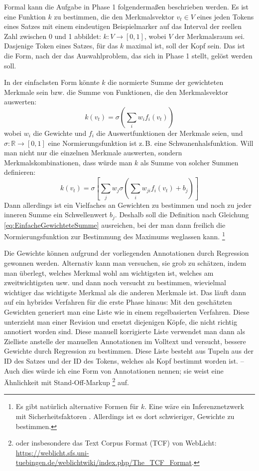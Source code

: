 \documentclass{article}
\renewcommand*{\see}{\autocap{v}gl\adddot}%
\begin{document}
Formal kann die Aufgabe in Phase 1 folgendermaßen beschrieben
werden. Es ist eine Funktion $k$ zu bestimmen, die den Merkmalsvektor
$v_t\in V$ eines jeden Tokens eines Satzes mit einem eindeutigen
Beispielmarker auf das Interval der reellen Zahl zwischen 0 und 1
abbildet: $k:V \to [0,1]$, wobei $V$ der Merkmalsraum sei. Dasjenige
Token eines Satzes, für das $k$ maximal ist, soll der Kopf sein. Das
ist die Form, nach der das Auswahlproblem, das sich in Phase 1 stellt,
gelöst werden soll.

In der einfachsten Form könnte $k$ die normierte Summe der gewichteten
Merkmale sein bzw. die Summe von Funktionen, die den Merkmalsvektor
auswerten:
\begin{equation}
\label{eq:EinfacheGewichteteSumme}
k(v_t) = \sigma \left( \sum\limits_iw_if_i(v_t) \right)
\end{equation}
wobei $w_i$ die Gewichte und $f_i$ die Auswertfunktionen der Merkmale
seien, und $\sigma:\mathbb{R}\to [0,1]$ eine Normierungsfunktion ist
z.\,B. eine Schwanenhalsfunktion. Will man nicht nur die einzelnen
Merkmale auswerten, sondern Merkmalskombinationen, dass würde man $k$
als Summe von solcher Summen definieren:
\begin{equation}
  k(v_t) = \sigma\left[ \sum\limits_jw_j\sigma \left( \sum\limits_iw_{ji}f_i(v_t) +b_j\right)\right]
\end{equation}
Dann allerdings ist ein Vielfaches an Gewichten zu bestimmen und noch
zu jeder inneren Summe ein Schwellenwert $b_j$. Deshalb soll die
Definition nach Gleichung \ref{eq:EinfacheGewichteteSumme} ausreichen,
bei der man dann freilich die Normierungsfunktion zur Bestimmung des
Maximums weglassen kann.%
\footnote{Es gibt natürlich alternative Formen für $k$. Eine wäre ein
  Inferenznetzwerk mit
  Sicherheitsfaktoren \parencite[\see][90--96]{Beierle2014a}. Allerdings
  ist es dort schwieriger, Gewichte zu bestimmen.}

Die Gewichte können aufgrund der vorliegenden Annotationen durch
Regression gewonnen werden. Alternativ kann man versuchen, sie grob zu
schätzen, indem man überlegt, welches Merkmal wohl am wichtigsten ist,
welches am zweitwichtigsten usw. und dann noch versucht zu bestimmen,
wievielmal wichtiger das wichtigste Merkmal als die anderen Merkmale
ist. Das läuft dann auf ein hybrides Verfahren für die erste Phase
hinaus: Mit den geschätzten Gewichten generiert man eine Liste wie in
einem regelbasierten Verfahren. Diese unterzieht man einer Revision
und ersetzt diejenigen Köpfe, die nicht richtig annotiert worden
sind. Diese manuell korrigierte Liste verwendet man dann als Zielliste
anstelle der manuellen Annotationen im Volltext und versucht, bessere
Gewichte durch Regression zu bestimmen. Diese Liste besteht aus Tupeln
aus der ID des Satzes und der ID des Tokens, welches als Kopf bestimmt
worden ist. -- Auch dies würde ich eine Form von Annotationen nennen;
sie weist eine Ähnlichkeit mit Stand-Off-Markup%
\footnote{\Parencite[\see\ z.\,B.][575--579]{TEIP5} oder insbesondere
  das Text Corpus Format (TCF) von WebLicht:
  \url{https://weblicht.sfs.uni-tuebingen.de/weblichtwiki/index.php/The_TCF_Format}.} %
auf.
\end{document}
